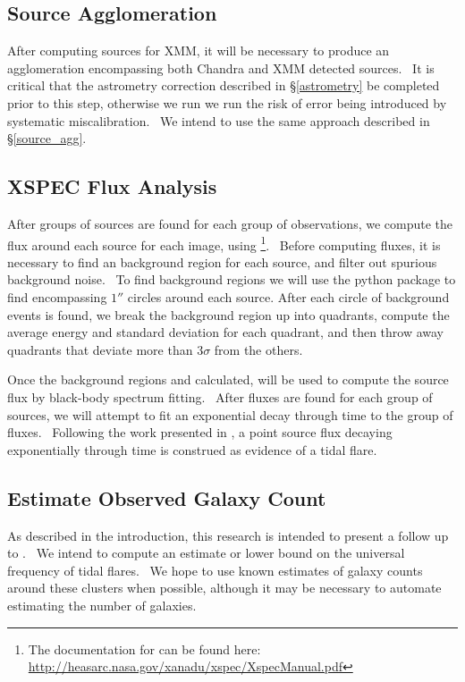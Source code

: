 \documentclass{amsart}
\newcommand{\tmtexttt}[1]{{\ttfamily{#1}}}
\begin{document}
\subsection{Source Agglomeration}

After computing sources for XMM, it will be necessary to produce an
agglomeration encompassing both Chandra and XMM detected sources. \ It is
critical that the astrometry correction described in {\S}\ref{astrometry} be
completed prior to this step, otherwise we run we run the risk of error being
introduced by systematic miscalibration. \ We intend to use the same approach
described in {\S}\ref{source_agg}.

\subsection{XSPEC Flux Analysis}

After groups of sources are found for each group of observations, we compute
the flux around each source for each image, using
\tmtexttt{xspec}{\footnote{The documentation for \tmtexttt{xspec} can be found
here:
\href{http://heasarc.nasa.gov/xanadu/xspec/XspecManual.pdf}{http://heasarc.nasa.gov/xanadu/xspec/XspecManual.pdf}}}.
\ Before computing fluxes, it is necessary to find an background region for
each source, and filter out spurious background noise. \ To find background
regions we will use the python package \tmtexttt{kapteyn} to find encompassing
$1''$ circles around each source. After each circle of background events is
found, we break the background region up into quadrants, compute the average
energy and standard deviation for each quadrant, and then throw away quadrants
that deviate more than $3 \sigma$ from the others. \

Once the background regions and calculated, \tmtexttt{xspec} will be used to
compute the source flux by black-body spectrum fitting. \ After fluxes are
found for each group of sources, we will attempt to fit an exponential decay
through time to the group of fluxes. \ Following the work presented in
{\cite{maksym_tidal_2010}}, a point source flux decaying exponentially through
time is construed as evidence of a tidal flare.

\subsection{Estimate Observed Galaxy Count}

As described in the introduction, this research is intended to present a
follow up to {\cite{maksym_constraining_2010}}. \ We intend to compute an
estimate or lower bound on the universal frequency of tidal flares. \ We hope
to use known estimates of galaxy counts around these clusters when possible,
although it may be necessary to automate estimating the number of galaxies.
\end{document}

